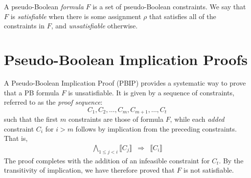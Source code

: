 \documentclass{easychair}
\renewcommand{\obar}[1]{\overline{#1}}
\newcommand{\lit}{\ell}
\newcommand{\assign}{\rho}
\newcommand{\imply}{\Rightarrow}
\newcommand{\func}[1]{\llbracket#1\rrbracket}
\begin{document}


A pseudo-Boolean {\em formula} $F$ is a set of pseudo-Boolean
constraints.  We say that $F$ is {\em satisfiable} when there is some
assignment $\assign$ that satisfies all of the constraints in $F$, and
{\em unsatisfiable} otherwise.  


\section{Pseudo-Boolean Implication Proofs}

A Pseudo-Boolean Implication Proof (PBIP) provides a systematic way to
prove that a PB formula $F$ is unsatisfiable.  It is given by a sequence of constraints, referred to as the {\em proof sequence}:
\begin{displaymath}
  C_1, C_2, \ldots, C_m, C_{m+1}, \ldots, C_t
\end{displaymath}  
such that the first $m$ constraints are those of formula $F$, while each {\em added} constraint $C_i$
for  $i > m$ follows by implication from the preceding constraints.
That is, 
\begin{eqnarray}
\bigwedge_{1 \leq j < i} \func{C_j} & \imply & \func{C_i} \label{eqn:proofsequence}
\end{eqnarray}
The proof completes with the addition of an infeasible constraint for $C_t$.
By the transitivity of implication, we have therefore proved that $F$ is not satisfiable.
\end{document}
